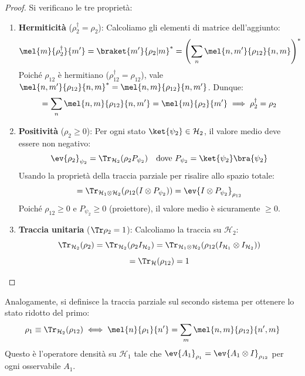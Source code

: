 \begin{proof} Si verificano le tre proprietà:
    \begin{enumerate}
        \item \textbf{Hermiticità} ($\rho_2^\dagger = \rho_2$):
        Calcoliamo gli elementi di matrice dell'aggiunto:
        \[
            \mel{m}{\rho_2^\dagger}{m'} = \braket{m'}{\rho_2|m}^* = \left( \sum_n \mel{n,m'}{\rho_{12}}{n,m} \right)^*
        \]
        Poiché $\rho_{12}$ è hermitiano ($\rho_{12}^\dagger = \rho_{12}$), vale $\mel{n,m'}{\rho_{12}}{n,m}^* = \mel{n,m}{\rho_{12}}{n,m'}$. Dunque:
        \[
            = \sum_n \mel{n,m}{\rho_{12}}{n,m'} = \mel{m}{\rho_2}{m'} \implies \rho_2^\dagger = \rho_2
        \]

        \item \textbf{Positività} ($\rho_2 \ge 0$):
        Per ogni stato $\ket{\psi_2} \in \mathcal{H}_2$, il valore medio deve essere non negativo:
        \[
            \ev{\rho_2}_{\psi_2} = \Tr_{\mathcal{H}_2}(\rho_2 P_{\psi_2}) \quad \text{dove } P_{\psi_2} = \ket{\psi_2}\bra{\psi_2}
        \]
        Usando la proprietà della traccia parziale per risalire allo spazio totale:
        \[
            = \Tr_{\mathcal{H}_1 \otimes \mathcal{H}_2} (\rho_{12} (I \otimes P_{\psi_2})) = \ev{I \otimes P_{\psi_2}}_{\rho_{12}}
        \]
        Poiché $\rho_{12} \ge 0$ e $P_{\psi_2} \ge 0$ (proiettore), il valore medio è sicuramente $\ge 0$.

        \item \textbf{Traccia unitaria} ($\Tr \rho_2 = 1$):
        Calcoliamo la traccia su $\mathcal{H}_2$:
        \[
            \Tr_{\mathcal{H}_2}(\rho_2) = \Tr_{\mathcal{H}_2}(\rho_2 I_{\mathcal{H}_2}) = \Tr_{\mathcal{H}_1 \otimes \mathcal{H}_2}(\rho_{12} (I_{\mathcal{H}_1} \otimes I_{\mathcal{H}_2}))
        \]
        \[
            = \Tr_{\mathcal{H}}(\rho_{12}) = 1
        \]
    \end{enumerate}
\end{proof}

Analogamente, si definisce la traccia parziale sul secondo sistema per ottenere lo stato ridotto del primo:
\[
    \rho_1 \equiv \Tr_{\mathcal{H}_2}(\rho_{12}) \iff \mel{n}{\rho_1}{n'} = \sum_m \mel{n,m}{\rho_{12}}{n',m}
\]
Questo è l'operatore densità su $\mathcal{H}_1$ tale che $\ev{A_1}_{\rho_1} = \ev{A_1 \otimes I}_{\rho_{12}}$ per ogni osservabile $A_1$.

